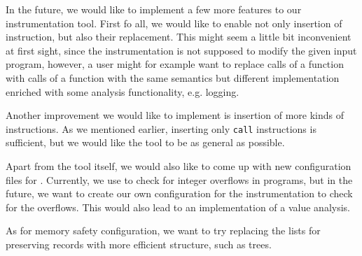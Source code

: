 In the future, we would like to implement a few more features to our
instrumentation tool. First fo all, we would like to enable not only insertion
of instruction, but also their replacement. This might seem a little bit
inconvenient at first sight, since the instrumentation is not supposed to
modify the given input program, however, a user might for example want to
replace calls of a function with calls of a function with the same semantics
but different implementation enriched with some analysis functionality, e.g.
logging.

Another improvement we would like to implement is insertion of more kinds of
instructions. As we mentioned earlier, inserting only \texttt{call}
instructions is sufficient, but we would like the tool to be as general as
possible.

Apart from the tool itself, we would also like to come up with new
configuration files for \symbiotic. Currently, we use \clang to check for
integer overflows in programs, but in the future, we want to create our own
configuration for the instrumentation to check for the overflows. This would
also lead to an implementation of a value analysis. 

As for memory safety configuration, we want to try replacing the lists for
preserving records with more efficient structure, such as trees.  

